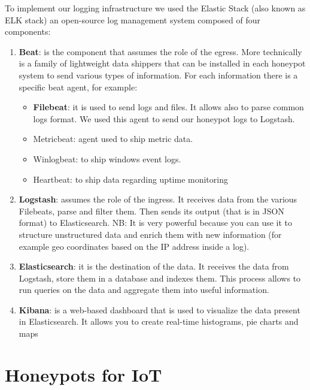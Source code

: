 \documentclass[epsfig,a4paper,11pt,titlepage,oneside,openany]{book}
\begin{document}
To implement our logging infrastructure we used the Elastic Stack (also known as ELK stack) an open-source log management system composed of four components:
\begin{enumerate}
\item \textbf{Beat}: is the component that assumes the role of the egress. More technically is a family of lightweight data shippers that can be installed in each honeypot system to send various types of information. For each information there is a specific beat agent, for example:
	\begin{itemize}
	\item \textbf{Filebeat}: it is used to send logs and files. It allows also to parse common logs format. We used this agent to send our honeypot logs to Logstash.
	\item Metricbeat: agent used to ship metric data.
	\item Winlogbeat: to ship windows event logs.
	\item Heartbeat: to ship data regarding uptime monitoring
	\end{itemize}
\item \textbf{Logstash}: assumes the role of the ingress. It receives data from the various Filebeats, parse and filter them. Then sends its output (that is in JSON format) to Elasticsearch. NB: It is very powerful because you can use it to structure unstructured data and enrich them with new information (for example geo coordinates based on the IP address inside a log).
\item \textbf{Elasticsearch}: it is the destination of the data. It receives the data from Logstash, store them  in a database and indexes them. This process allows to run queries on the data and aggregate them into useful information. 
\item \textbf{Kibana}: is a web-based dashboard that is used to visualize the data present in Elasticsearch. It allows you to create real-time histograms, pie charts and maps
\end{enumerate}

\chapter{Honeypots for IoT}
\endgroup


%


\end{document}
